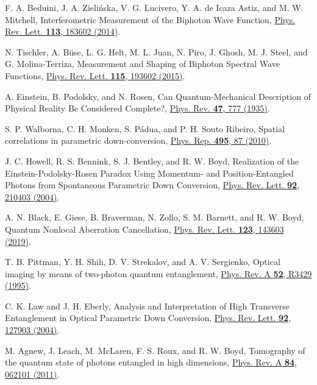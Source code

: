 \documentclass[pra,english,reprint,nofootinbib,aps,superscriptaddress,showpacs,showkeys]{revtex4-2}
\theoremstyle{definition}
\theoremstyle{remark}
\begin{document}
\begin{thebibliography}{99}
		F. A. Beduini, J. A. Zieli\'{n}ska, V. G. Lucivero, Y. A. de Icaza Astiz, and M. W. Mitchell,
		Interferometric Measurement of the Biphoton Wave Function,
		\href{https://doi.org/10.1103/PhysRevLett.113.183602}{Phys. Rev. Lett. \textbf{113}, 183602 (2014)}.
		
		N. Tischler, A. B\"{u}se, L. G. Helt, M. L. Juan, N. Piro, J. Ghosh, M. J. Steel, and G. Molina-Terriza,
		Measurement and Shaping of Biphoton Spectral Wave Functions,
		\href{https://doi.org/10.1103/PhysRevLett.115.193602}{Phys. Rev. Lett. \textbf{115}, 193602 (2015)}.
		
		A. Einstein, B. Podolsky, and N. Rosen,
		Can Quantum-Mechanical Description of Physical Reality Be Considered Complete?,
		\href{https://doi.org/10.1103/PhysRev.47.777}{Phys. Rev. \textbf{47}, 777 (1935)}.
		
		S. P. Walborna, C. H. Monken, S. P\'{a}dua, and P. H. Souto Ribeiro,
		Spatial correlations in parametric down-conversion,
		\href{https://doi.org/10.1016/j.physrep.2010.06.003}{Phys. Rep. \textbf{495}, 87 (2010)}.
		
		J. C. Howell, R. S. Bennink, S. J. Bentley, and R. W. Boyd,
		Realization of the Einstein-Podolsky-Rosen Paradox Using Momentum- and Position-Entangled Photons from Spontaneous Parametric Down Conversion,
		\href{https://doi.org/10.1103/PhysRevLett.92.210403}{Phys. Rev. Lett. \textbf{92}, 210403 (2004)}.
		
		A. N. Black, E. Giese, B. Braverman, N. Zollo, S. M. Barnett, and R. W. Boyd,
		Quantum Nonlocal Aberration Cancellation,
		\href{https://doi.org/10.1103/PhysRevLett.123.143603}{Phys. Rev. Lett. \textbf{123}, 143603 (2019)}.
		
		T. B. Pittman, Y. H. Shih, D. V. Strekalov, and A. V. Sergienko,
		Optical imaging by means of two-photon quantum entanglement,
		\href{https://doi.org/10.1103/PhysRevA.52.R3429}{Phys. Rev. A \textbf{52}, R3429 (1995)}.
		
		C. K. Law and J. H. Eberly,
		Analysis and Interpretation of High Transverse Entanglement in Optical Parametric Down Conversion,
		\href{https://doi.org/10.1103/PhysRevLett.92.127903}{Phys. Rev. Lett. \textbf{92}, 127903 (2004)}.
		
		M. Agnew, J. Leach, M. McLaren, F. S. Roux, and R. W. Boyd,
		Tomography of the quantum state of photons entangled in high dimensions,
		\href{https://doi.org/10.1103/PhysRevA.84.062101}{Phys. Rev. A \textbf{84}, 062101 (2011)}.
		

\end{thebibliography}
\end{document}
